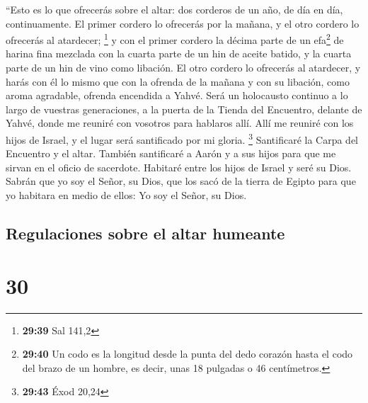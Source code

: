 ``Esto es lo que ofrecerás sobre el altar: dos corderos
de un año, de día en día, continuamente.  El primer
cordero lo ofrecerás por la mañana, y el otro cordero lo ofrecerás al
atardecer; \footnote{\textbf{29:39} Sal 141,2}  y con el
primer cordero la décima parte de un efa\footnote{\textbf{29:40} Un codo
  es la longitud desde la punta del dedo corazón hasta el codo del brazo
  de un hombre, es decir, unas 18 pulgadas o 46 centímetros.} de harina
fina mezclada con la cuarta parte de un hin de aceite batido, y la
cuarta parte de un hin de vino como libación.  El otro
cordero lo ofrecerás al atardecer, y harás con él lo mismo que con la
ofrenda de la mañana y con su libación, como aroma agradable, ofrenda
encendida a Yahvé.  Será un holocausto continuo a lo
largo de vuestras generaciones, a la puerta de la Tienda del Encuentro,
delante de Yahvé, donde me reuniré con vosotros para hablaros allí.
 Allí me reuniré con los hijos de Israel, y el lugar será
santificado por mi gloria. \footnote{\textbf{29:43} Éxod 20,24}
 Santificaré la Carpa del Encuentro y el altar. También
santificaré a Aarón y a sus hijos para que me sirvan en el oficio de
sacerdote.  Habitaré entre los hijos de Israel y seré su
Dios.  Sabrán que yo soy el Señor, su Dios, que los sacó
de la tierra de Egipto para que yo habitara en medio de ellos: Yo soy el
Señor, su Dios.

\hypertarget{regulaciones-sobre-el-altar-humeante}{%
\subsection{Regulaciones sobre el altar
humeante}\label{regulaciones-sobre-el-altar-humeante}}

\hypertarget{section-29}{%
\section{30}\label{section-29}}

